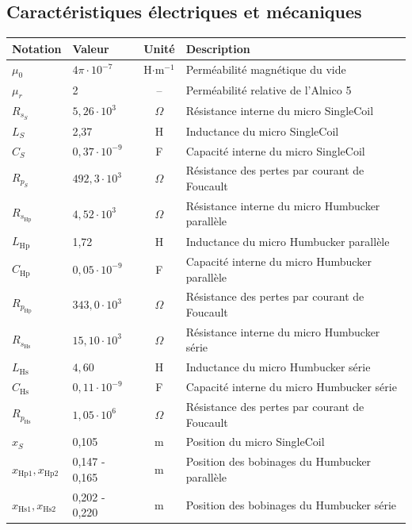\documentclass[11pt, a4paper]{article}
\begin{document}
\subsection{Caractéristiques électriques et mécaniques}
\begin{center}
\small
\begin{tabularx}{\textwidth}{llcX}
\toprule
\textbf{Notation} & \textbf{Valeur} & \textbf{Unité} & \textbf{Description} \\
\midrule
$\mu_{0}$ & $4\pi \cdot 10^{-7}$ & H$\cdot$m$^{-1}$ & Perméabilité magnétique du vide \\
$\mu_{r}$ & 2 & -- & Perméabilité relative de l'Alnico 5 \\
\midrule
$R_{s_S}$ & $5,26 \cdot 10^3$ & $\Omega$ & Résistance interne du micro SingleCoil \\
$L_{S}$ & 2,37 & H & Inductance du micro SingleCoil \\
$C_{S}$ & $0,37 \cdot 10^{-9}$ & F & Capacité interne du micro SingleCoil \\
$R_{p_S}$ & $492,3 \cdot 10^3$ & $\Omega$ & Résistance des pertes par courant de Foucault \\
\midrule
$R_{s_{\text{Hp}}}$ & $4,52 \cdot 10^3$ & $\Omega$ & Résistance interne du micro Humbucker parallèle \\
$L_{\text{Hp}}$ & 1,72 & H & Inductance du micro Humbucker parallèle \\
$C_{\text{Hp}}$ & $0,05 \cdot 10^{-9}$ & F & Capacité interne du micro Humbucker parallèle \\
$R_{p_{\text{Hp}}}$ & $343,0 \cdot 10^3$ & $\Omega$ & Résistance des pertes par courant de Foucault \\
\midrule
$R_{s_{\text{Hs}}}$ & $15,10 \cdot 10^3$ & $\Omega$ & Résistance interne du micro Humbucker série \\
$L_{\text{Hs}}$ & $4,60$ & H & Inductance du micro Humbucker série \\
$C_{\text{Hs}}$ & $0,11 \cdot 10^{-9}$ & F & Capacité interne du micro Humbucker série \\
$R_{p_{\text{Hs}}}$ & $1,05 \cdot 10^6$ & $\Omega$ & Résistance des pertes par courant de Foucault \\
\midrule
$x_{S}$ & 0,105 & m & Position du micro SingleCoil \\
$x_{\text{Hp1}}, x_{\text{Hp2}}$ & 0,147 - 0,165 & m & Position des bobinages du Humbucker parallèle \\
$x_{\text{Hs1}}, x_{\text{Hs2}}$ & 0,202 - 0,220 & m & Position des bobinages du Humbucker série \\

\end{tabularx}
\end{center}
\end{document}
